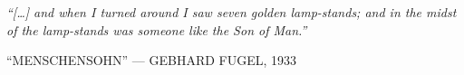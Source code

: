 \clearpage
\thispagestyle{empty}
\null\vfill
\settowidth{}
\begin{center}
\parbox{\longest}{%
  \raggedright{\huge\itshape%
    ``[…] and when I turned around I saw seven golden lamp-stands; and in the midst of the lamp-stands was someone like the Son of Man.'' \par\bigskip
  }
  \raggedleft\Large\MakeUppercase{``Menschensohn'' — Gebhard Fugel, 1933}\par%
}
\vfill\vfill
\clearpage\newpage
\end{center}
\newpage
\thispagestyle{empty}
\begin{center}
\end{center}